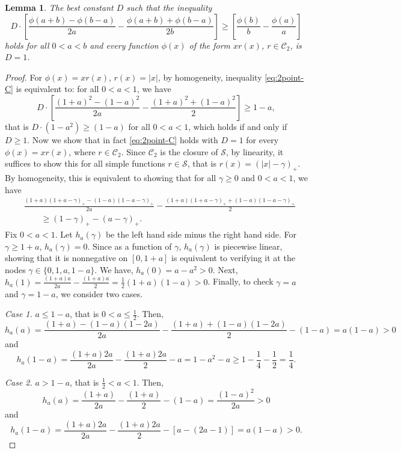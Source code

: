 \documentclass[10pt]{article}
\newcommand{\1}{\textbf{1}}
\newtheorem{lemma}[theorem]{Lemma}
\theoremstyle{remark}
\theoremstyle{definition}
\begin{document}
\begin{lemma}\label{lm:2point-C}
The best constant $D$ such that the inequality
\begin{equation}\label{eq:2point-C}
D\cdot\left[\frac{\phi(a+b)-\phi(b-a)}{2a} - \frac{\phi(a+b)+\phi(b-a)}{2b}\right] \geq \left[ \frac{\phi(b)}{b}-\frac{\phi(a)}{a}\right]
\end{equation}
holds for all $0 < a < b$ and every function $\phi(x)$ of the form $xr(x)$, $r \in \mathcal{C}_2$, is $D=1$.
\end{lemma}
\begin{proof}
For $\phi(x) = xr(x)$, $r(x) = |x|$, by homogeneity, inequality \eqref{eq:2point-C} is equivalent to: for all $0 < a < 1$, we have
\[
D\cdot\left[\frac{(1+a)^2-(1-a)^2}{2a} - \frac{(1+a)^2+(1-a)^2}{2}\right] \geq 1-a,
\]
that is $D\cdot(1-a^2) \geq (1-a)$ for all $0 < a < 1$, which holds if and only if $D \geq 1$. Now we show that in fact \eqref{eq:2point-C} holds with $D=1$ for every $\phi(x) = xr(x)$, where $r \in \mathcal{C}_2$. Since $\mathcal{C}_2$ is the closure of $\mathcal{S}$, by linearity, it suffices to show this for all simple functions $r \in \mathcal{S}$, that is $r(x) = (|x|-\gamma)_+$. By homogeneity, this is equivalent to showing that for all $\gamma \geq 0$ and $0 < a < 1$, we have
\begin{align*}
&\frac{(1+a)(1+a-\gamma)_+-(1-a)(1-a-\gamma)_+}{2a} - \frac{(1+a)(1+a-\gamma)_++(1-a)(1-a-\gamma)_+}{2} \\
&\qquad\geq (1-\gamma)_+-(a-\gamma)_+.
\end{align*}
Fix $0 < a < 1$. Let $h_a(\gamma)$ be the left hand side minus the right hand side. For $\gamma \geq 1+a$, $h_a(\gamma) = 0$. Since as a function of $\gamma$, $h_a(\gamma)$ is piecewise linear, showing that it is nonnegative on $[0,1+a]$ is equivalent to verifying it at the nodes $\gamma \in \{0, 1, a, 1-a\}$. We have, $h_a(0) = a-a^2 > 0$. Next, $h_a(1) = \frac{(1+a)a}{2a} - \frac{(1+a)a}{2} = \frac{1}{2}(1+a)(1-a) > 0$. Finally, to check $\gamma = a$ and $\gamma = 1-a$, we consider two cases.

\bigskip
\noindent
\emph{Case 1.} $a \leq 1-a$, that is $0< a \leq \frac{1}{2}$. Then,
\[
h_a(a) = \frac{(1+a)-(1-a)(1-2a)}{2a} - \frac{(1+a)+(1-a)(1-2a)}{2} - (1-a) = a(1-a) > 0
\]
and
\[
h_a(1-a) = \frac{(1+a)2a}{2a} - \frac{(1+a)2a}{2}-a = 1-a^2-a \geq 1 - \frac{1}{4} - \frac{1}{2} = \frac{1}{4}.
\]


\bigskip
\noindent
\emph{Case 2.} $a > 1-a$, that is $\frac{1}{2} < a <1$. Then,
\[
h_a(a) = \frac{(1+a)}{2a} - \frac{(1+a)}{2} - (1-a) = \frac{(1-a)^2}{2a} > 0
\]
and
\[
h_a(1-a) = \frac{(1+a)2a}{2a} - \frac{(1+a)2a}{2}-[a-(2a-1)] = a(1-a) > 0.
\]
\end{proof}
\end{document}
